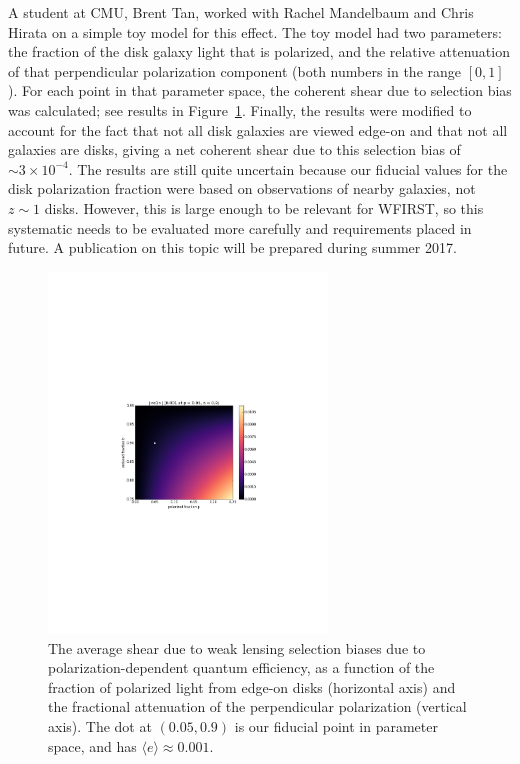 A student at CMU, Brent Tan, worked with Rachel Mandelbaum and Chris Hirata on a simple toy model
for this effect.  The toy model had two parameters: the fraction of the disk galaxy light that is
polarized, and the relative attenuation of that perpendicular polarization component (both numbers
in the range $[0,1]$).  For each point in that parameter space, the coherent shear due to selection
bias was calculated; see results in Figure~\ref{fig:polarization}.  Finally, the results were
modified to account for the fact that not all disk galaxies are viewed edge-on and that not all
galaxies are disks, giving a net coherent shear due to this selection bias of $\sim 3\times
10^{-4}$.  The results are still quite uncertain because our fiducial values for the disk
polarization fraction were based on observations of nearby galaxies, not $z\sim 1$ disks.  However,
this is large enough to be relevant for WFIRST, so this systematic needs to be evaluated more
carefully and requirements placed in future.  A publication on this topic will be prepared during
summer 2017.
\begin{figure}[t]
\includegraphics[width=0.66\textwidth]{Plots/polarization-selection.pdf}
\caption{\label{fig:polarization}
The average shear due to weak lensing selection biases due to polarization-dependent quantum
efficiency, as a function of the fraction of polarized light from edge-on disks (horizontal axis)
and the fractional attenuation of the perpendicular polarization (vertical axis).  The dot at
$(0.05,0.9)$ is our fiducial point in parameter space, and has $\langle e\rangle \approx 0.001$.
}
\end{figure}

